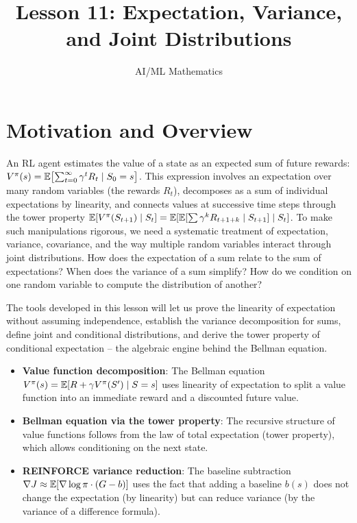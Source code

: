 \documentclass[11pt,a4paper]{article}
\title{Lesson 11: Expectation, Variance, and Joint Distributions}
\author{AI/ML Mathematics}
\date{}
\begin{document}
\maketitle
\tableofcontents
\newpage


\section{Motivation and Overview}
\label{sec:motivation}

An RL agent estimates the value of a state as an expected sum of future
rewards: $V^\pi(s) = \mathbb{E}\bigl[\sum_{t=0}^\infty \gamma^t R_t \mid
S_0 = s\bigr]$. This expression involves an expectation over many random
variables (the rewards $R_t$), decomposes as a sum of individual
expectations by linearity, and connects values at successive time steps
through the tower property
$\mathbb{E}[V^\pi(S_{t+1}) \mid S_t] = \mathbb{E}[\mathbb{E}[\sum \gamma^k R_{t+1+k} \mid
S_{t+1}] \mid S_t]$. To make such manipulations rigorous, we need
a systematic treatment of expectation, variance, covariance, and the way
multiple random variables interact through joint distributions. How does
the expectation of a sum relate to the sum of expectations? When does the
variance of a sum simplify? How do we condition on one random variable to
compute the distribution of another?

The tools developed in this lesson will let us prove the linearity of
expectation without assuming independence, establish the variance
decomposition for sums, define joint and conditional distributions, and
derive the tower property of conditional expectation -- the algebraic
engine behind the Bellman equation.

\begin{rlconnection}[title={Why Expectation and Joint Distributions
    Matter for RL/ML}]
\begin{itemize}[nosep]
    \item \textbf{Value function decomposition}: The Bellman equation
    $V^\pi(s) = \mathbb{E}[R + \gamma V^\pi(S') \mid S = s]$ uses linearity of
    expectation to split a value function into an immediate reward and a
    discounted future value.
    \item \textbf{Bellman equation via the tower property}: The recursive
    structure of value functions follows from the law of total
    expectation (tower property), which allows conditioning on the next
    state.
    \item \textbf{REINFORCE variance reduction}: The baseline subtraction
    $\nabla J \approx \mathbb{E}[\nabla \log\pi \cdot (G - b)]$ uses the fact
    that adding a baseline $b(s)$ does not change the expectation (by
    linearity) but can reduce variance (by the variance of a
    difference formula).
\end{itemize}
\end{rlconnection}
\end{document}
